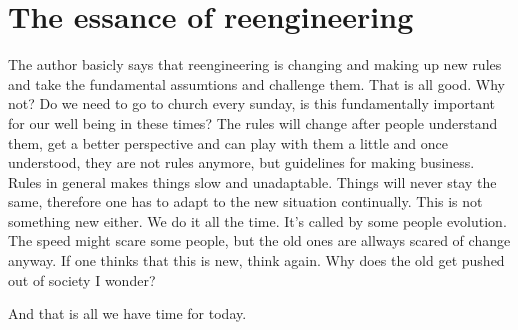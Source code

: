 \documentclass{article}
\begin{document}
\section{The essance of reengineering}
The author basicly says that reengineering is changing and making up new rules and take the fundamental assumtions and challenge them. That is all good. Why not? Do we need to go to church every sunday, is this fundamentally important for our well being in these times? The rules will change after people understand them, get a better perspective and can play with them a little and once understood, they are not rules anymore, but guidelines for making business. Rules in general makes things slow and unadaptable. Things will never stay the same, therefore one has to adapt to the new situation continually. This is not something new either. We do it all the time. It's called by some people evolution. The speed might scare some people, but the old ones are allways scared of change anyway. If one thinks that this is new, think again. Why does the old get pushed out of society I wonder?


And that is all we have time for today.
\end{document}
